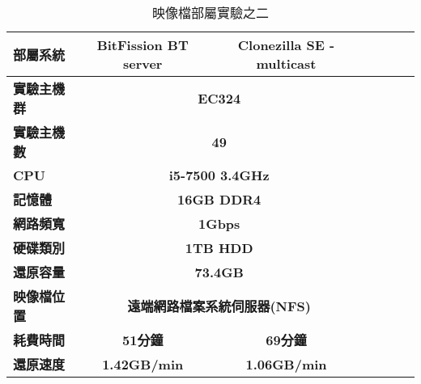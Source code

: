 \begin{table}[!htbp]
\centering
\caption{映像檔部屬實驗之二}
\label{exp2}
\begin{adjustbox}{max width=0.92\textwidth}
\begin{tabular}{lcccccc}

\toprule
\multicolumn{1}{l}{\textbf{部屬系統}} & \textbf{BitFission BT server} & \textbf{Clonezilla SE - multicast} \\ \midrule
\multicolumn{1}{l}{\textbf{實驗主機群}} & \multicolumn{2}{c}{\textbf{EC324}} \\
\multicolumn{1}{l}{\textbf{實驗主機數}} & \multicolumn{2}{c}{\textbf{49}} \\
\multicolumn{1}{l}{\textbf{CPU}} & \multicolumn{2}{c}{\textbf{i5-7500 3.4GHz}} \\
\multicolumn{1}{l}{\textbf{記憶體}} & \multicolumn{2}{c}{\textbf{16GB DDR4}} \\
\multicolumn{1}{l}{\textbf{網路頻寬}} & \multicolumn{2}{c}{\textbf{1Gbps}} \\
\multicolumn{1}{l}{\textbf{硬碟類別}} & \multicolumn{2}{c}{\textbf{1TB HDD}} \\
\multicolumn{1}{l}{\textbf{還原容量}} & \multicolumn{2}{c}{\textbf{73.4GB}} \\
\multicolumn{1}{l}{\textbf{映像檔位置}} & \multicolumn{2}{c}{\textbf{遠端網路檔案系統伺服器(NFS)}} \\
\multicolumn{1}{l}{\textbf{耗費時間}} & \textbf{51分鐘} & \textbf{69分鐘} \\
\multicolumn{1}{l}{\textbf{還原速度}} & \textbf{1.42GB/min} & \textbf{1.06GB/min} \\

\bottomrule
\end{tabular}
\end{adjustbox}
\end{table}
